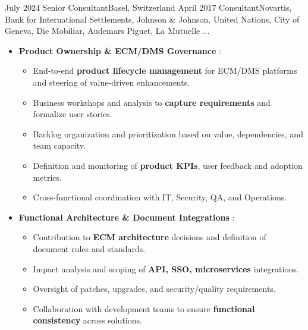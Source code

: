
\begin{experiences}

\consultantexperience
    {July 2024} {Senior Consultant}{}{Basel, Switzerland}
    {April 2017} {Consultant}{Novartis, Bank for International Settlements, Johnson \& Johnson, United Nations, City of Geneva, Die Mobiliar, Audemars Piguet, La Mutuelle ...} {
        \begin{itemize}[left=0pt,label={},itemsep=0.5em]
        \vspace{0.3em}

          \item \textbf{Product Ownership \& ECM/DMS Governance} :
            \begin{itemize}[itemsep=0.2em,topsep=0.2em,parsep=0pt]
              \small
              \item End-to-end \textbf{product lifecycle management} for ECM/DMS platforms and steering of value-driven enhancements.
              \item Business workshops and analysis to \textbf{capture requirements} and formalize user stories.
              \item Backlog organization and prioritization based on value, dependencies, and team capacity.
              \item Definition and monitoring of \textbf{product KPIs}, user feedback and adoption metrics.
              \item Cross-functional coordination with IT, Security, QA, and Operations.
            \end{itemize}

          \vspace{0.3em}

          \item \textbf{Functional Architecture \& Document Integrations} :
            \begin{itemize}[itemsep=0.2em,topsep=0.2em,parsep=0pt]
              \small
              \item Contribution to \textbf{ECM architecture} decisions and definition of document rules and standards.
              \item Impact analysis and scoping of \textbf{API, SSO, microservices} integrations.
              \item Oversight of patches, upgrades, and security/quality requirements.
              \item Collaboration with development teams to ensure \textbf{functional consistency} across solutions.
            \end{itemize}


\end{itemize}}
\end{experiences}
